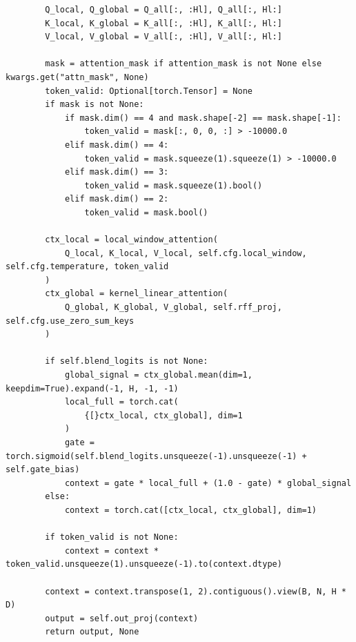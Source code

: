 \begin{lstlisting}
        Q_local, Q_global = Q_all[:, :Hl], Q_all[:, Hl:]
        K_local, K_global = K_all[:, :Hl], K_all[:, Hl:]
        V_local, V_global = V_all[:, :Hl], V_all[:, Hl:]

        mask = attention_mask if attention_mask is not None else kwargs.get("attn_mask", None)
        token_valid: Optional[torch.Tensor] = None
        if mask is not None:
            if mask.dim() == 4 and mask.shape[-2] == mask.shape[-1]:
                token_valid = mask[:, 0, 0, :] > -10000.0
            elif mask.dim() == 4:
                token_valid = mask.squeeze(1).squeeze(1) > -10000.0
            elif mask.dim() == 3:
                token_valid = mask.squeeze(1).bool()
            elif mask.dim() == 2:
                token_valid = mask.bool()

        ctx_local = local_window_attention(
            Q_local, K_local, V_local, self.cfg.local_window, self.cfg.temperature, token_valid
        )
        ctx_global = kernel_linear_attention(
            Q_global, K_global, V_global, self.rff_proj, self.cfg.use_zero_sum_keys
        )

        if self.blend_logits is not None:
            global_signal = ctx_global.mean(dim=1, keepdim=True).expand(-1, H, -1, -1)
            local_full = torch.cat(
                {[}ctx_local, ctx_global], dim=1
            )
            gate = torch.sigmoid(self.blend_logits.unsqueeze(-1).unsqueeze(-1) + self.gate_bias)
            context = gate * local_full + (1.0 - gate) * global_signal
        else:
            context = torch.cat([ctx_local, ctx_global], dim=1)

        if token_valid is not None:
            context = context * token_valid.unsqueeze(1).unsqueeze(-1).to(context.dtype)

        context = context.transpose(1, 2).contiguous().view(B, N, H * D)
        output = self.out_proj(context)
        return output, None



\end{lstlisting}
